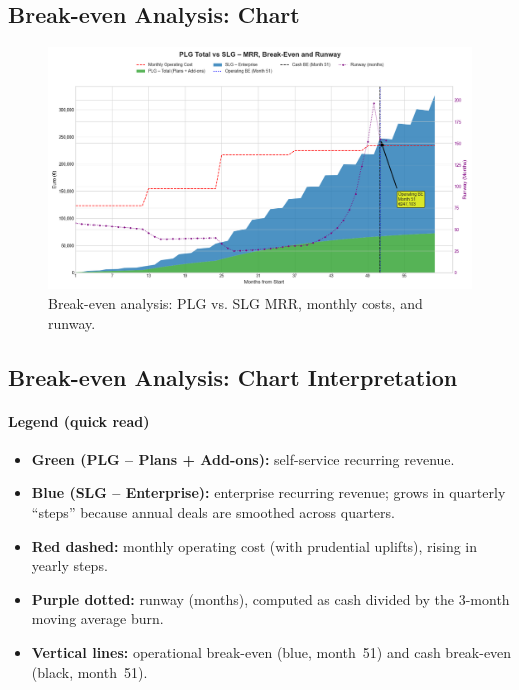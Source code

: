 \documentclass[11pt, a4paper, oneside]{article}
\begin{document}
\newpage
\subsection{Break-even Analysis: Chart}
\begin{figure}[H]
    \centering 
    \includegraphics[width=\textwidth]{financial_projection.png}
    \caption{Break-even analysis: PLG vs. SLG MRR, monthly costs, and runway.}
    \label{fig:break_even_analysis}
\end{figure} 
\subsection{Break-even Analysis: Chart Interpretation}

\paragraph{Legend (quick read)}
\begin{itemize}
  \item \textbf{Green (PLG -- Plans + Add-ons):} self-service recurring revenue.
  \item \textbf{Blue (SLG -- Enterprise):} enterprise recurring revenue; grows in quarterly ``steps'' because annual deals are smoothed across quarters.
  \item \textbf{Red dashed:} monthly operating cost (with prudential uplifts), rising in yearly steps.
  \item \textbf{Purple dotted:} runway (months), computed as cash divided by the 3-month moving average burn.
  \item \textbf{Vertical lines:} operational break-even (blue, month~51) and cash break-even (black, month~51).
\end{itemize}
\end{document}
